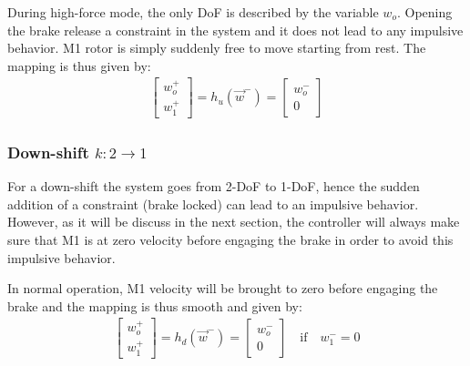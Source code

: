 During high-force mode, the only DoF is described by the variable $w_o$. Opening the brake release a constraint in the system and it does not lead to any impulsive behavior. M1 rotor is simply suddenly free to move starting from rest. The mapping is thus given by:
\begin{align} 
\left[
\begin{array}{c}
w_o^+ \\ w_1^+
\end{array}
\right] = h_u( \vec{w}^- ) = 
\left[
\begin{array}{c}
w_o^- \\ 0
\end{array}
\right]
\label{eq:upshiftmap}
\end{align}



\subsubsection{Down-shift $k:2\rightarrow1$}

For a down-shift the system goes from 2-DoF to 1-DoF, hence the sudden addition of a constraint (brake locked) can lead to an impulsive behavior. However, as it will be discuss in the next section, the controller will always make sure that M1 is at zero velocity before engaging the brake in order to avoid this impulsive behavior. 


In normal operation, M1 velocity will be brought to zero before engaging the brake and the mapping is thus smooth and given by:
%
\begin{align} 
\left[
\begin{array}{c}
w_o^+ \\ w_1^+
\end{array}
\right]
 = h_d( \vec{w}^- ) = 
\left[
\begin{array}{c}
w_o^- \\ 0
\end{array}
\right] \quad \text{if} \quad w_1^-=0
\label{eq:downshiftmap_ideal}
\end{align}


